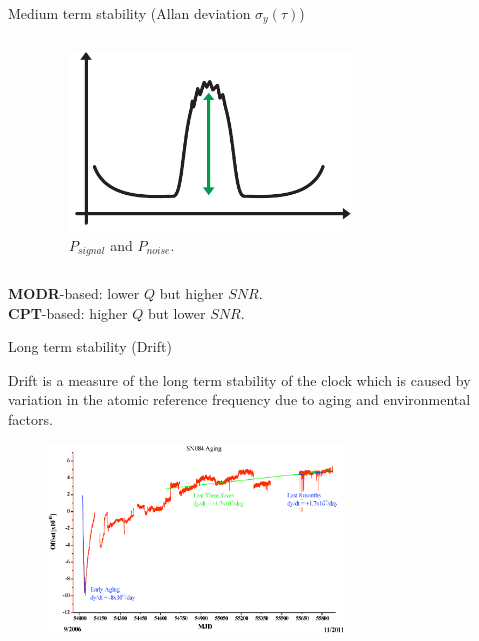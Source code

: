 \begin{frame}{Medium term stability (Allan deviation $\sigma_y(\tau)$)}
\begin{columns}[c, onlytextwidth]
\begin{column}{0.5\textwidth}
        \end{column}

        \begin{column}{0.5\textwidth}

            \begin{figure}
                \centering
                \includegraphics[width=0.7\textwidth]{pdf/P-signal.pdf}
                \caption{$P_{signal}$ and $P_{noise}$.}
            \end{figure}

        \end{column}

    \end{columns}

    \textbf{MODR}-based: lower $Q$ but higher $SNR$.\\
    \textbf{CPT}-based: higher $Q$ but lower $SNR$.

\end{frame}



\begin{frame}{Long term stability (Drift)}

    Drift is a measure of the long term stability of the clock which is caused by variation in the atomic reference frequency due to aging and environmental factors.

    \begin{figure}
        \centering
        \includegraphics[width=0.7\textwidth]{img/drift.png}
    \end{figure}


\end{frame}



